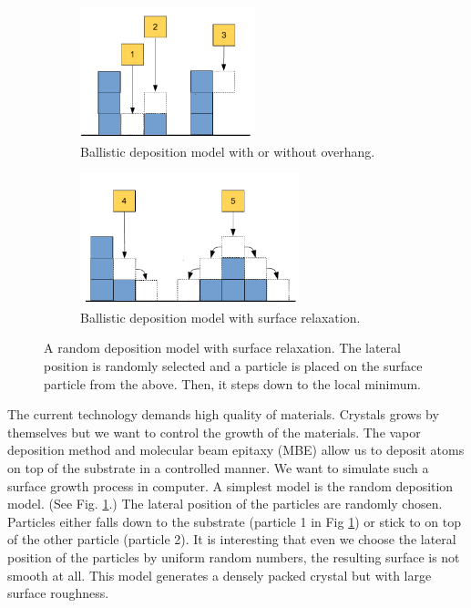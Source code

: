 \begin{figure}
	\centering
	\begin{subfigure}{0.45\textwidth}
		\centering
		\includegraphics[width=2.0in]{15.Random-Numbers/deposition_model1.pdf}
		\caption{Ballistic deposition model with or without overhang.}
		\label{fig:ballistic_deposition1}
	\end{subfigure}
	\begin{subfigure}{0.45\textwidth}
		\centering
		\includegraphics[width=2.5in]{15.Random-Numbers/deposition_model2.pdf}
		\caption{Ballistic deposition model with surface relaxation.}
		\label{fig:ballistic_deposition2}
	\end{subfigure}
	\caption{A random deposition model with surface relaxation.  The lateral position is randomly selected and a particle is placed on the surface particle from the above.  Then, it steps down to the local minimum.} 
	\label{fig:deposition_model}
\end{figure}


The current technology demands high quality of materials. Crystals grows by themselves but we want to control the growth of the materials.  The vapor deposition method and molecular beam epitaxy (MBE) allow us to deposit atoms on top of the substrate in a controlled manner.  We want to simulate such a surface growth process in computer.  A simplest model is the random deposition model.\cite{ballistic_growth} (See Fig. \ref{fig:ballistic_deposition1}.)
The lateral position of the particles are randomly chosen.  Particles either falls down to the substrate (particle 1 in Fig \ref{fig:ballistic_deposition1}) or stick to on top of the other particle (particle 2).  It is interesting that even we choose the lateral position of the particles by uniform random numbers, the resulting surface is not smooth at all. This model generates a densely packed crystal but with large surface roughness.  

